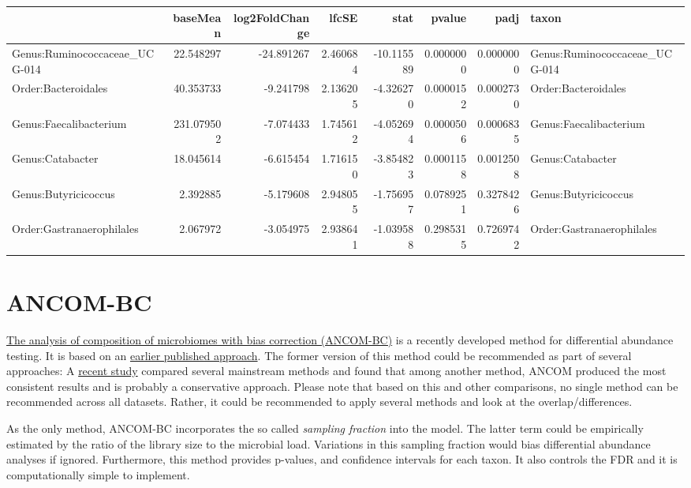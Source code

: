 \documentclass[
  oneside]{book}
\begin{document}
\begin{table}
\centering
\begin{tabular}{l|r|r|r|r|r|r|l}
\hline
  & baseMean & log2FoldChange & lfcSE & stat & pvalue & padj & taxon\\
\hline
Genus:Ruminococcaceae\_UCG-014 & 22.548297 & -24.891267 & 2.460684 & -10.115589 & 0.0000000 & 0.0000000 & Genus:Ruminococcaceae\_UCG-014\\
\hline
Order:Bacteroidales & 40.353733 & -9.241798 & 2.136205 & -4.326270 & 0.0000152 & 0.0002730 & Order:Bacteroidales\\
\hline
Genus:Faecalibacterium & 231.079502 & -7.074433 & 1.745612 & -4.052694 & 0.0000506 & 0.0006835 & Genus:Faecalibacterium\\
\hline
Genus:Catabacter & 18.045614 & -6.615454 & 1.716150 & -3.854823 & 0.0001158 & 0.0012508 & Genus:Catabacter\\
\hline
Genus:Butyricicoccus & 2.392885 & -5.179608 & 2.948055 & -1.756957 & 0.0789251 & 0.3278426 & Genus:Butyricicoccus\\
\hline
Order:Gastranaerophilales & 2.067972 & -3.054975 & 2.938641 & -1.039588 & 0.2985315 & 0.7269742 & Order:Gastranaerophilales\\
\hline
\end{tabular}
\end{table}

\hypertarget{ancom-bc}{%
\section{ANCOM-BC}\label{ancom-bc}}

\href{https://www.nature.com/articles/s41467-020-17041-7}{The analysis of composition of microbiomes with bias correction (ANCOM-BC)}
is a recently developed method for differential abundance testing. It is based on an
\href{https://www.ncbi.nlm.nih.gov/pmc/articles/PMC4450248/}{earlier published approach}.
The former version of this method could be recommended as part of several approaches:
A \href{https://www.biorxiv.org/content/10.1101/2021.05.10.443486v1.full}{recent study}
compared several mainstream methods and found that among another method, ANCOM produced the most consistent results and is probably a conservative approach. Please note that based on this and other comparisons, no single method can be recommended across all datasets. Rather, it could be recommended to apply several methods and look at the overlap/differences.

As the only method, ANCOM-BC incorporates the so called \emph{sampling fraction} into the model. The latter term could be empirically estimated by the ratio of the library size to the microbial load. Variations in this sampling fraction would bias differential abundance analyses if ignored. Furthermore, this method provides p-values, and confidence intervals for each taxon.
It also controls the FDR and it is computationally simple to implement.
\end{document}
